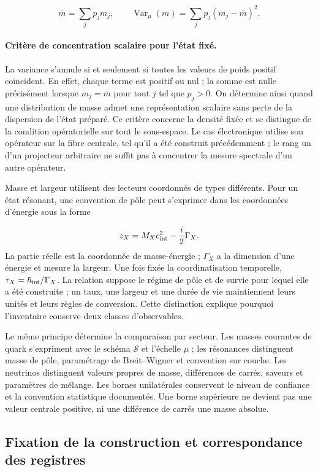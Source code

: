 \[
 \overline m=\sum_jp_jm_j,\qquad
 \operatorname{Var}_{\mu}(m)=\sum_jp_j(m_j-\overline m)^2.
\]
\paragraph{Critère de concentration scalaire pour l’état fixé.
}
La variance s’annule si et seulement si toutes les valeurs de poids positif
coïncident. En effet, chaque terme est positif ou nul ; la somme est nulle
précisément lorsque \(m_j=\overline m\) pour tout \(j\) tel que
\(p_j>0\). On détermine ainsi quand une distribution de masse admet
une représentation scalaire sans perte de la dispersion de l’état préparé.
Ce critère concerne la densité fixée et se distingue de la condition
opératorielle sur tout le sous-espace. Le cas électronique utilise son
opérateur sur la fibre centrale, tel qu’il a été construit précédemment ;
le rang un d’un projecteur arbitraire ne suffit pas à concentrer la mesure
spectrale d’un autre opérateur.


Masse et largeur utilisent des lecteurs coordonnés de types différents. Pour un
état résonant, une convention de pôle peut s’exprimer dans les coordonnées
d’énergie sous la forme

\[
 z_X=M_Xc_{\rm int}^{2}-\frac{i}{2}\Gamma_X.
\]
La partie réelle est la coordonnée de masse-énergie ; \(\Gamma_X\) a la
dimension d’une énergie et mesure la largeur. Une fois fixée la coordinatisation temporelle,
\(\tau_X=\hbar_{\rm int}/\Gamma_X\). La relation suppose le régime de
pôle et de survie pour lequel elle a été construite ; un taux, une largeur et
une durée de vie maintiennent leurs unités et leurs règles de conversion. Cette
distinction explique pourquoi l’inventaire conserve deux classes d’observables.


Le même principe détermine la comparaison par secteur. Les masses courantes
de quark s’expriment avec le schéma \(\mathscr S\) et l’échelle \(\mu\) ;
les résonances distinguent masse de pôle, paramétrage de Breit--Wigner et
convention sur couche. Les neutrinos distinguent valeurs propres de masse,
différences de carrés, saveurs et paramètres de mélange. Les bornes
unilatérales conservent le niveau de confiance et la convention statistique
documentés. Une borne supérieure ne devient pas une valeur centrale positive,
ni une différence de carrés une masse absolue.


\subsection{Fixation de la construction et correspondance des registres
}
\label{subsec:vi-congelacion}


